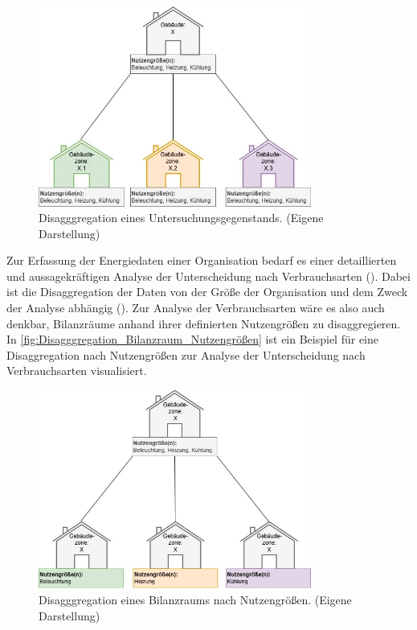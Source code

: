 \begin{figure}[H]
    \centering
    \includegraphics[width=0.8\textwidth]{../../Ressourcen/Abbildungen/Untersuchungsgegenstand_Zerlegt.jpg}
    \caption{Disagggregation eines Untersuchungsgegenstands. (Eigene Darstellung)}
    \label{fig:Disagggregation_Bilanzraum_Untersuchungsgegenstand}
\end{figure}

Zur Erfassung der Energiedaten einer Organisation bedarf es einer detaillierten und aussagekräftigen Analyse der Unterscheidung nach Verbrauchsarten 
(\cite[S. 14]{Hohnhold.2013}). Dabei ist die Disaggregation der Daten von der Größe der Organisation und dem Zweck der Analyse abhängig (\cite[S. 14f.]{Hohnhold.2013}).
Zur Analyse der Verbrauchsarten wäre es also auch denkbar, Bilanzräume anhand ihrer definierten Nutzengrößen zu disaggregieren.
In \eqref{fig:Disagggregation_Bilanzraum_Nutzengrößen} ist ein Beispiel für eine Disaggregation nach Nutzengrößen 
zur Analyse der Unterscheidung nach Verbrauchsarten visualisiert.




\begin{figure}[H]
    \centering
    \includegraphics[width=0.8\textwidth]{../../Ressourcen/Abbildungen/Nutzengröße_Bewertungseinheit_Zerlegt.jpg}
    \caption{Disagggregation eines Bilanzraums nach Nutzengrößen. (Eigene Darstellung)}
    \label{fig:Disagggregation_Bilanzraum_Nutzengrößen}
\end{figure}